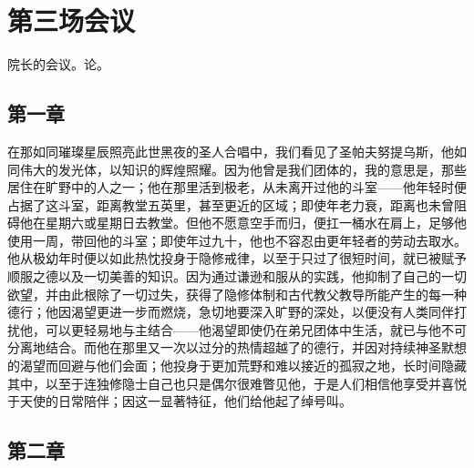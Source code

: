 
\section{第三场会议}

\par

院长的会议。论。\par


\subsection{第一章}

\par

在那如同璀璨星辰照亮此世黑夜的圣人合唱中，我们看见了圣帕夫努提乌斯，他如同伟大的发光体，以知识的辉煌照耀。因为他曾是我们团体的，我的意思是，那些居住在旷野中的人之一；他在那里活到极老，从未离开过他的斗室——他年轻时便占据了这斗室，距离教堂五英里，甚至更近的区域；即使年老力衰，距离也未曾阻碍他在星期六或星期日去教堂。但他不愿意空手而归，便扛一桶水在肩上，足够他使用一周，带回他的斗室；即使年过九十，他也不容忍由更年轻者的劳动去取水。他从极幼年时便以如此热忱投身于隐修戒律，以至于只过了很短时间，就已被赋予顺服之德以及一切美善的知识。因为通过谦逊和服从的实践，他抑制了自己的一切欲望，并由此根除了一切过失，获得了隐修体制和古代教父教导所能产生的每一种德行；他因渴望更进一步而燃烧，急切地要深入旷野的深处，以便没有人类同伴打扰他，可以更轻易地与主结合——他渴望即使仍在弟兄团体中生活，就已与他不可分离地结合。而他在那里又一次以过分的热情超越了的德行，并因对持续神圣默想的渴望而回避与他们会面；他投身于更加荒野和难以接近的孤寂之地，长时间隐藏其中，以至于连独修隐士自己也只是偶尔很难瞥见他，于是人们相信他享受并喜悦于天使的日常陪伴；因这一显著特征，他们给他起了绰号叫。\par


\subsection{第二章}

